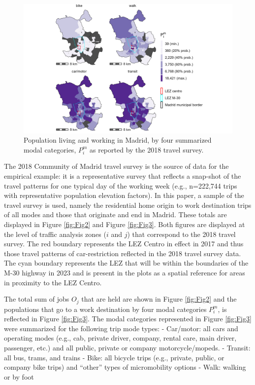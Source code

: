 \documentclass[]{trbunofficial}
\begin{document}
\begin{figure}

{\centering \includegraphics[width=1\linewidth]{images/im_populations_zn208_plot} 

}

\caption{\label{fig:Fig3} Population living and working in Madrid, by four summarized modal categories, $P^m_i$ as reported by the 2018 travel survey.}\label{fig:pop-plot}
\end{figure}

The 2018 Community of Madrid travel survey is the source of data for the
empirical example: it is a representative survey that reflects a
snap-shot of the travel patterns for one typical day of the working week
(e.g., n=222,744 trips with representative population elevation
factors). In this paper, a sample of the travel survey is used, namely
the residential home origin to work destination trips of all modes and
those that originate and end in Madrid. These totals are displayed in
Figure \ref{fig:Fig2} and Figure \ref{fig:Fig3}. Both figures are
displayed at the level of traffic analysis zones (\(i\) and \(j\)) that
correspond to the 2018 travel survey. The red boundary represents the
LEZ Centro in effect in 2017 and thus those travel patterns of
car-restriction reflected in the 2018 travel survey data. The cyan
boundary represents the LEZ that will be within the boundaries of the
M-30 highway in 2023 and is present in the plots as a spatial reference
for areas in proximity to the LEZ Centro.

The total sum of jobs \(O_j\) that are held are shown in Figure
\ref{fig:Fig2} and the populations that go to a work destination by four
modal categories \(P^m_i\), is reflected in Figure \ref{fig:Fig3}. The
modal categories represented in Figure \ref{fig:Fig3} were summarized
for the following trip mode types: - Car/motor: all cars and operating
modes (e.g., cab, private driver, company, rental care, main driver,
passenger, etc.) and all public, private or company motorcycle/mopeds. -
Transit: all bus, trams, and trains - Bike: all bicycle trips (e.g.,
private, public, or company bike trips) and ``other'' types of
micromobility options - Walk: walking or by foot
\end{document}

